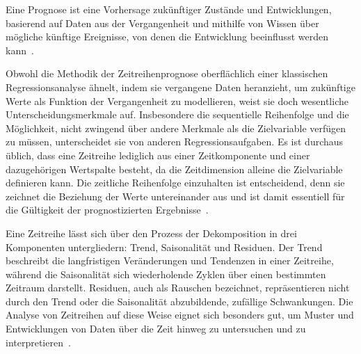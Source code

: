 Eine Prognose ist eine Vorhersage zukünftiger Zustände und Entwicklungen, basierend auf Daten aus der Vergangenheit und mithilfe von Wissen über mögliche künftige Ereignisse, von denen die Entwicklung beeinflusst werden kann~\cite{Peixeiro.2022}.

Obwohl die Methodik der Zeitreihenprognose oberflächlich einer klassischen Regressionsanalyse ähnelt, indem sie vergangene Daten heranzieht, um zukünftige Werte als Funktion der Vergangenheit zu modellieren, weist sie doch wesentliche Unterscheidungsmerkmale auf.
Insbesondere die sequentielle Reihenfolge und die Möglichkeit, nicht zwingend über andere Merkmale als die Zielvariable verfügen zu müssen, unterscheidet sie von anderen Regressionsaufgaben.
Es ist durchaus üblich, dass eine Zeitreihe lediglich aus einer Zeitkomponente und einer dazugehörigen Wertspalte besteht, da die Zeitdimension alleine die Zielvariable definieren kann.
Die zeitliche Reihenfolge einzuhalten ist entscheidend, denn sie zeichnet die Beziehung der Werte untereinander aus und ist damit essentiell für die Gültigkeit der prognostizierten Ergebnisse~\cite{Peixeiro.2022}.

Eine Zeitreihe lässt sich über den Prozess der Dekomposition in drei Komponenten untergliedern:
Trend, Saisonalität und Residuen.
Der Trend beschreibt die langfristigen Veränderungen und Tendenzen in einer Zeitreihe, während die Saisonalität sich wiederholende Zyklen über einen bestimmten Zeitraum darstellt.
Residuen, auch als Rauschen bezeichnet, repräsentieren nicht durch den Trend oder die Saisonalität abzubildende, zufällige Schwankungen.
Die Analyse von Zeitreihen auf diese Weise eignet sich besonders gut, um Muster und Entwicklungen von Daten über die Zeit hinweg zu untersuchen und zu interpretieren~\cite{Peixeiro.2022}.

